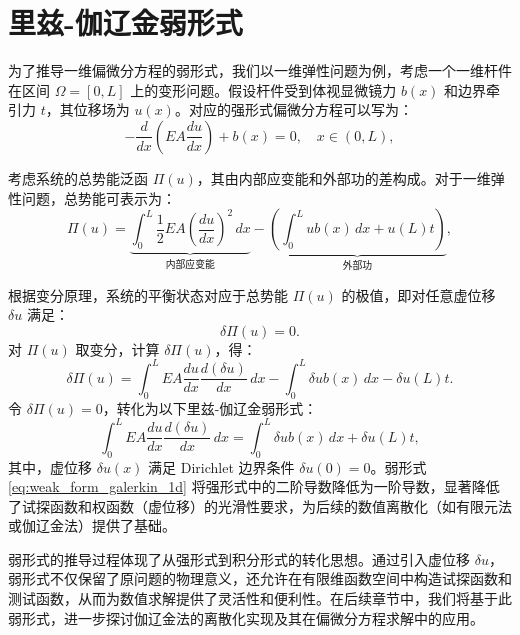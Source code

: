 \documentclass[engineeringmaster]{hquThesis}
\begin{document}
\section{里兹-伽辽金弱形式}
为了推导一维偏微分方程的弱形式，我们以一维弹性问题为例，考虑一个一维杆件在区间 \( \Omega = [0, L] \) 上的变形问题。假设杆件受到体视显微镜力 \( b(x) \) 和边界牵引力 \( t \)，其位移场为 \( u(x) \)。对应的强形式偏微分方程可以写为：
\begin{equation}
    -\frac{d}{dx} \left( EA \frac{du}{dx} \right) + b(x) = 0, \quad x \in (0, L),
    \label{eq:strong_form_1d}
\end{equation}

考虑系统的总势能泛函 \( \Pi(u) \)，其由内部应变能和外部功的差构成。对于一维弹性问题，总势能可表示为：
\begin{equation}
    \Pi(u) = \underbrace{\int_0^L \frac{1}{2} EA \left( \frac{du}{dx} \right)^2 \, dx}_{\text{内部应变能}} - \underbrace{\left( \int_0^L u b(x) \, dx + u(L) t \right)}_{\text{外部功}},
    \label{eq:total_potential_energy_1d}
\end{equation}

根据变分原理，系统的平衡状态对应于总势能 \( \Pi(u) \) 的极值，即对任意虚位移 \( \delta u \) 满足：
\begin{equation}
    \delta \Pi(u) = 0.
    \label{eq:variational_principle_1d}
\end{equation}
对 \( \Pi(u) \) 取变分，计算 \( \delta \Pi(u) \)，得：
\begin{equation}
    \delta \Pi(u) = \int_0^L EA \frac{du}{dx} \frac{d(\delta u)}{dx} \, dx - \int_0^L \delta u b(x) \, dx - \delta u(L) t.
    \label{eq:variation_1d}
\end{equation}
令 \( \delta \Pi(u) = 0 \)，转化为以下里兹-伽辽金弱形式：
\begin{equation}
    \int_0^L EA \frac{du}{dx} \frac{d(\delta u)}{dx} \, dx = \int_0^L \delta u b(x) \, dx + \delta u(L) t,
    \label{eq:weak_form_galerkin_1d}
\end{equation}
其中，虚位移 \( \delta u(x) \) 满足 Dirichlet 边界条件 \( \delta u(0) = 0 \)。弱形式 \eqref{eq:weak_form_galerkin_1d} 将强形式中的二阶导数降低为一阶导数，显著降低了试探函数和权函数（虚位移）的光滑性要求，为后续的数值离散化（如有限元法或伽辽金法）提供了基础。

弱形式的推导过程体现了从强形式到积分形式的转化思想。通过引入虚位移 \( \delta u \)，弱形式不仅保留了原问题的物理意义，还允许在有限维函数空间中构造试探函数和测试函数，从而为数值求解提供了灵活性和便利性。在后续章节中，我们将基于此弱形式，进一步探讨伽辽金法的离散化实现及其在偏微分方程求解中的应用。
\end{document}
